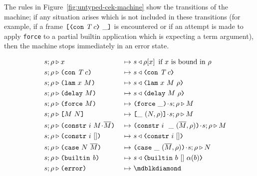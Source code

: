 The rules in Figure~\ref{fig:untyped-cek-machine} show the transitions of the
machine; if any situation arises which is not included in these transitions (for
example, if a frame $\inAppRightFrame{\VCon{\tn}{c}}$ is encountered or if an
attempt is made to apply \texttt{force} to a partial builtin application which
is expecting a term argument), then the machine stops immediately in an error
state.


\begin{figure}[H]
  \begin{subfigure}[c]{\linewidth}

    \begin{minipage}{\linewidth}
\begin{alignat*}{2}
 s;\rho & \compute x                                 &~\mapsto~& s \return  \rho[x] \enskip \text{if $x$ is bound in $\rho$}\\
 s;\rho & \compute \con{\tn}{c}                       &~\mapsto~& s \return \VCon{\tn}{c}\\
 s;\rho & \compute \lamU{x}{M}                       &~\mapsto~& s \return \VLamAbs{x}{M}{\rho}\\
 s;\rho & \compute \delay{M}                         &~\mapsto~& s\return \VDelay{M}{\rho}\\
 s;\rho & \compute \force{M}                         &~\mapsto~& \inForceFrame{} \cons s;\rho \compute M \\
 s;\rho & \compute \appU{M}{N}                       &~\mapsto~& \inAppLeftFrame{(N,\rho)} \cons s ;\rho \compute M\\
 s;\rho & \compute \constr{i}{M \cons \repetition{M}} &~\mapsto~& \inConstrFrame{i}{}{(\repetition{M},\rho)} \cons s ;\rho \compute M\\
 s;\rho & \compute \constr{i}{[]} &~\mapsto~&  s \return \VConstr{i}{[]}\\
 s;\rho & \compute \kase{N}{\repetition{M}} &~\mapsto~&  \inCaseFrame{(\repetition{M},\rho)} \cons s ;\rho \compute N\\
 s;\rho & \compute \builtin{b}                      &~\mapsto~& s \return \VBuiltin{b}{[]}{\arity{b}}\\
 s;\rho & \compute \errorU                           &~\mapsto~& \cekerror{}\\
\\[-10pt] %

\end{alignat*}
\end{minipage}
\end{subfigure}
\end{figure}
